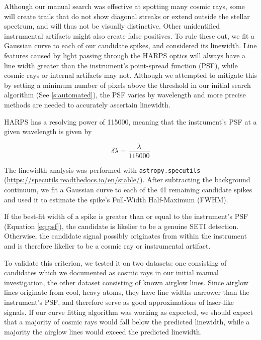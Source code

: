 \documentclass[linenumbers]{aastex631}
\begin{document}
Although our manual search was effective at spotting many cosmic rays, some will create trails that do not show diagonal streaks or extend outside the stellar spectrum, and will thus not be visually distinctive.  Other unidentified instrumental artifacts might also create false positives.  To rule these out, we fit a Gaussian curve to each of our candidate spikes, and considered its linewidth.  Line features caused by light passing through the HARPS optics will always have a line width greater than the instrument's point-spread function (PSF), while cosmic rays or internal artifacts may not. Although we attempted to mitigate this by setting a minimum number of pixels above the threshold in our initial search algorithm (See \ref{s:automated}), the PSF varies by wavelength and more precise methods are needed to accurately ascertain linewidth.

HARPS has a resolving power \citep{HARPS_specs} of 115000, meaning that the instrument's PSF at a given wavelength is given by 

\begin{equation}
    \delta\lambda = \frac{\lambda}{115000}
    \label{eq:psf}
\end{equation}

The linewidth analysis was performed with \texttt{astropy.specutils} (\url{https://specutils.readthedocs.io/en/stable/}). After subtracting the background continuum, we fit a Gaussian curve to each of the 41 remaining candidate spikes and used it to estimate the spike's Full-Width Half-Maximum (FWHM).

If the best-fit width of a spike is greater than or equal to the instrument's PSF (Equation \ref{eq:psf}), the candidate is likelier to be a genuine SETI detection. Otherwise, the candidate signal possibly originates from within the instrument and is therefore likelier to be a cosmic ray or instrumental artifact.

To validate this criterion, we tested it on two datasets: one consisting of candidates which we documented as cosmic rays in our initial manual investigation, the other dataset consisting of known airglow lines.  Since airglow lines originate from cool, heavy atoms, they have line widths narrower than the instrument's PSF, and therefore serve as good approximations of laser-like  signals.  If our curve fitting algorithm was working as expected, we should expect that a majority of cosmic rays would fall below the predicted linewidth, while a majority the airglow lines would exceed the predicted linewidth.
\end{document}
